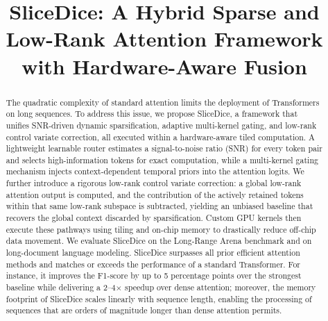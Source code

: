 \documentclass{article}
\title{SliceDice: A Hybrid Sparse and Low-Rank Attention Framework with Hardware-Aware Fusion}
\author{}
\begin{document}
\maketitle

\begin{abstract}
The quadratic complexity of standard attention limits the deployment of Transformers on long sequences. To address this issue, we propose SliceDice, a framework that unifies SNR-driven dynamic sparsification, adaptive multi-kernel gating, and low-rank control variate correction, all executed within a hardware-aware tiled computation. A lightweight learnable router estimates a signal-to-noise ratio (SNR) for every token pair and selects high-information tokens for exact computation, while a multi-kernel gating mechanism injects context-dependent temporal priors into the attention logits. We further introduce a rigorous low-rank control variate correction: a global low-rank attention output is computed, and the contribution of the actively retained tokens within that same low-rank subspace is subtracted, yielding an unbiased baseline that recovers the global context discarded by sparsification. Custom GPU kernels then execute these pathways using tiling and on-chip memory to drastically reduce off-chip data movement. We evaluate SliceDice on the Long-Range Arena benchmark and on long-document language modeling. SliceDice surpasses all prior efficient attention methods and matches or exceeds the performance of a standard Transformer. For instance, it improves the F1-score by up to 5 percentage points over the strongest baseline while delivering a 2--4$\times$ speedup over dense attention; moreover, the memory footprint of SliceDice scales linearly with sequence length, enabling the processing of sequences that are orders of magnitude longer than dense attention permits.
\end{abstract}
\end{document}
